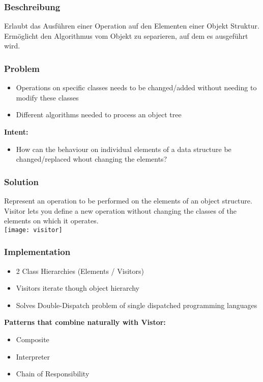 \subsubsection{Beschreibung}
Erlaubt das Ausführen einer Operation auf den Elementen einer Objekt Struktur. Ermöglicht den Algorithmus vom Objekt zu separieren, auf dem es ausgeführt wird.
\subsubsection{Problem}
\begin{itemize}[topsep=0pt]
    \itemsep -0.4em
    \item Operations on specific classes needs to be changed/added without needing to modify these classes
    \item Different algorithms needed to process an object tree
\end{itemize}
\textbf{Intent:}
\begin{itemize}[topsep=0pt]
    \itemsep -0.4em
    \item How can the behaviour on individual elements of a data structure be changed/replaced whout changing the elements?
\end{itemize}
\subsubsection{Solution}
Represent an operation to be performed on the elements of an object structure. Visitor lets you define a new operation without changing the classes of the elements on which it operates.\\ 
\texttt{[image: visitor]}
\subsubsection{Implementation}
\begin{itemize}[topsep=0pt]
    \itemsep -0.4em
    \item 2 Class Hierarchies (Elements / Visitors)
    \item Visitors iterate though object hierarchy
    \item Solves Double-Dispatch problem of single dispatched programming languages
\end{itemize}
\textbf{Patterns that combine naturally with Vistor:}
\begin{itemize}[topsep=0pt]
    \itemsep -0.4em
    \item Composite
    \item Interpreter
    \item Chain of Responsibility
\end{itemize}
